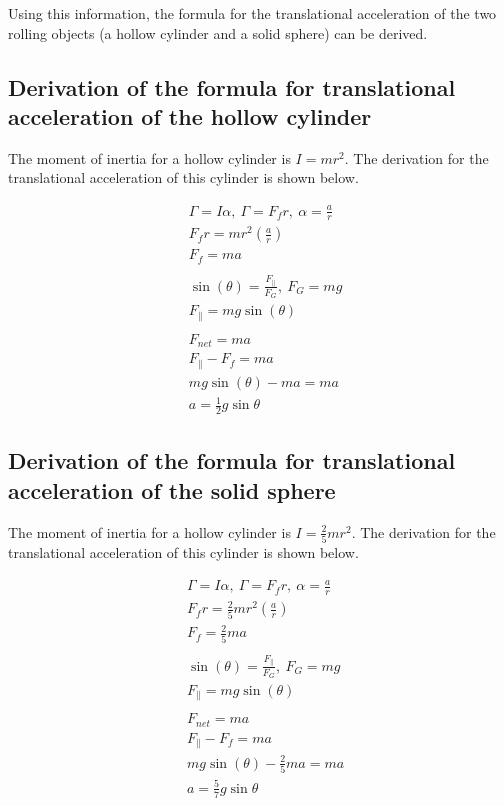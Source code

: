 \documentclass[letterpaper, 12pt]{article}
\begin{document}
Using this information, the formula for the translational acceleration of the two rolling objects
(a hollow cylinder and a solid sphere) can be derived.

\subsection{Derivation of the formula for translational acceleration of the hollow cylinder}

The moment of inertia for a hollow cylinder is $I = mr^2$. The derivation for the
translational acceleration of this cylinder is shown below.

\begin{align*}
     & \Gamma = I\alpha, ~ \Gamma = F_f r, ~ \alpha = \frac{a}{r}
    \\
     & F_f r = mr^2\left(\frac{a}{r}\right)
    \\
     & F_f = ma
    \\
    \\
     & \sin(\theta) = \frac{F_{\parallel}}{F_G}, ~ F_G = mg
    \\
     & F_{\parallel} = mg\sin(\theta)
    \\
    \\
     & F_{net} = ma
    \\
     & F_{\parallel} - F_f = ma
    \\
     & mg\sin(\theta) - ma = ma
    \\
     & a = \frac{1}{2}g\sin{\theta}
\end{align*}

\subsection{Derivation of the formula for translational acceleration of the solid sphere}

The moment of inertia for a hollow cylinder is $I = \frac{2}{5}mr^2$. The derivation for the
translational acceleration of this cylinder is shown below.

\begin{align*}
     & \Gamma = I\alpha, ~ \Gamma = F_f r, ~ \alpha = \frac{a}{r}
    \\
     & F_f r = \frac{2}{5}mr^2\left(\frac{a}{r}\right)
    \\
     & F_f = \frac{2}{5}ma
    \\
    \\
     & \sin(\theta) = \frac{F_{\parallel}}{F_G}, ~ F_G = mg
    \\
     & F_{\parallel} = mg\sin(\theta)
    \\
    \\
     & F_{net} = ma
    \\
     & F_{\parallel} - F_f = ma
    \\
     & mg\sin(\theta) - \frac{2}{5}ma = ma
    \\
     & a = \frac{5}{7}g\sin{\theta}
\end{align*}
\end{document}
